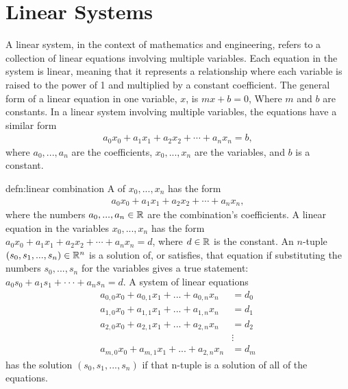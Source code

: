 \section{Linear Systems}

A linear system, in the context of mathematics and engineering, refers to a collection of linear equations involving multiple variables. Each equation in the system is linear, meaning that it represents a relationship where each variable is raised to the power of 1 and multiplied by a constant coefficient. The general form of a linear equation in one variable, $x$, is $mx + b = 0$, Where $m$ and $b$ are constants. In a linear system involving multiple variables, the equations have a similar form
\begin{align}
	a_0x_0 + a_1x_1 + a_2x_2 + \cdots + a_nx_n = b,
\end{align}
where $a_0, ..., a_n$ are the coefficients, $x_0, ..., x_n$ are the variables, and $b$ is a constant.


\begin{defn}{defn:linear combination}
	A  of $x_0,..., x_n$ has the form 
	\begin{align*}
	a_0x_0 + a_1x_1 + a_2x_2 + \cdots + a_nx_n,
	\end{align*}
	where the numbers $a_0,..., a_n \in {\mathbb R}$ are the combination’s coefficients. A linear
	equation in the variables $x_0,..., x_n$ has the form $a_0x_0 + a_1x_1 + a_2x_2 + \cdots +
	a_nx_n = d$, where $d \in{\mathbb R}$ is the constant. An $n$-tuple $(s_0, s_1,..., s_n) \in{\mathbb R}^n$ is a solution of, or satisfies, that equation
	if substituting the numbers $s_0,..., s_n$ for the variables gives a true statement: $a_0s_0 + a_1s_1 + · · · + a_ns_n = d$. A system of linear equations
	\begin{align*}
	a_{0,0}x_0 + a_{0,1}x_1 + ... + a_{0,n}x_n &= d_0 \\
	a_{1,0}x_0 + a_{1,1}x_1 + ... + a_{1,n}x_n &= d_1 \\
	a_{2,0}x_0 + a_{2,1}x_1 + ... + a_{2,n}x_n &= d_2 \\
	&\vdots \\
	a_{m,0}x_0 + a_{m,1}x_1 + ... + a_{2,n}x_n &= d_m
	\end{align*}
	has the solution $(s_0, s_1,..., s_n)$ if that n-tuple is a solution of all of the equations.
\end{defn}

